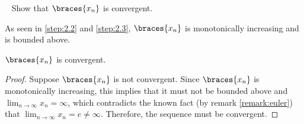 \begin{problem}
\begin{enumroman}
    \item~\label{step:2.4} Show that $\braces{x_n}$ is convergent.
    \begin{answer}
      As seen in \ref{step:2.2} and \ref{step:2.3},
      $\braces{x_n}$ is monotonically increasing and is bounded above.

      \begin{claim}
        $\braces{x_n}$ is convergent.

        \begin{proof}
          Suppose $\braces{x_n}$ is not convergent.
          Since $\braces{x_n}$ is monotonically increasing, this implies that
          it must not be bounded above and
          $\displaystyle \lim_{n \to \infty} x_n = \infty$,
          which contradicts the known fact (by remark \ref{remark:euler}) that
          $\displaystyle \lim_{n \to \infty} x_n = e \neq \infty$.
          Therefore, the sequence must be convergent.
        \end{proof}
      \end{claim}
    \end{answer}
  \end{enumroman}
\end{problem}
